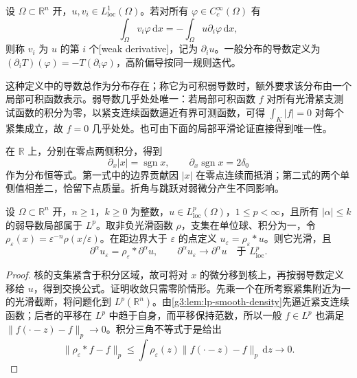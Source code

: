 \begin{definition}\label{g3:def:weak-derivative}
	设 \(\Omega\subset\mathbb R^n\) 开，\(u,v_i\in L^1_{\mathrm{loc}}(\Omega)\)。若对所有 \(\varphi\in C_c^\infty(\Omega)\) 有
	\[
		\int_\Omega v_i\varphi\,\mathrm dx=-\int_\Omega u\partial_i\varphi\,\mathrm dx,
	\]
	则称 \(v_i\) 为 \(u\) 的第 \(i\) 个[weak derivative]，记为 \(\partial_i u\)。一般分布的导数定义为 \((\partial_i T)(\varphi)= -T(\partial_i\varphi)\)，高阶偏导按同一规则迭代。
\end{definition}

这种定义中的导数总作为分布存在；称它为可积弱导数时，额外要求该分布由一个局部可积函数表示。弱导数几乎处处唯一：若局部可积函数 \(f\) 对所有光滑紧支测试函数的积分为零，以紧支连续函数逼近有界可测函数，可得 \(\int_K|f|=0\) 对每个紧集成立，故 \(f=0\) 几乎处处。也可由下面的局部平滑论证直接得到唯一性。

\begin{example}\label{g3:exm:corner-and-jump}
	在 \(\mathbb R\) 上，分别在零点两侧积分，得到
	\[
		\partial_x|x|=\operatorname{sgn}x,\qquad
		\partial_x\operatorname{sgn}x=2\delta_0
	\]
	作为分布恒等式。第一式中的边界贡献因 \(|x|\) 在零点连续而抵消；第二式的两个单侧值相差二，恰留下点质量。折角与跳跃对弱微分产生不同影响。
\end{example}

\begin{lemma}\label{g3:lem:local-weak-smoothing}
	设 \(\Omega\subset\mathbb R^n\) 开，\(n\ge1\)，\(k\ge0\) 为整数，\(u\in L^p_{\mathrm{loc}}(\Omega)\)，\(1\le p<\infty\)，且所有 \(|\alpha|\le k\) 的弱导数局部属于 \(L^p\)。取非负光滑函数 \(\rho\)，支集在单位球、积分为一，令 \(\rho_\varepsilon(x)=\varepsilon^{-n}\rho(x/\varepsilon)\)。在距边界大于 \(\varepsilon\) 的点定义 \(u_\varepsilon=\rho_\varepsilon*u\)。则它光滑，且
	\[
		\partial^\alpha u_\varepsilon=\rho_\varepsilon*\partial^\alpha u,
		\qquad \partial^\alpha u_\varepsilon\longrightarrow\partial^\alpha u
		\quad\text{于 }L^p_{\mathrm{loc}}.
	\]
\end{lemma}
\begin{proof}
	核的支集紧含于积分区域，故可将对 \(x\) 的微分移到核上，再按弱导数定义移给 \(u\)，得到交换公式。证明收敛只需零阶情形。先乘一个在所考察紧集附近为一的光滑截断，将问题化到 \(L^p(\mathbb R^n)\)。由\cref{g3:lem:lp-smooth-density}先逼近紧支连续函数；后者的平移在 \(L^p\) 中趋于自身，而平移保持范数，所以一般 \(f\in L^p\) 也满足 \(\|f(\cdot-z)-f\|_p\to0\)。积分三角不等式于是给出
	\[
		\|\rho_\varepsilon*f-f\|_p
		\le\int\rho_\varepsilon(z)\|f(\cdot-z)-f\|_p\,\mathrm dz\longrightarrow0.
	\]
\end{proof}

